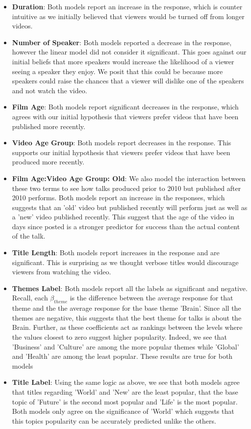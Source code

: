 \begin{itemize}
	\item \textbf{Duration}: Both models report an increase in the response, which is counter intuitive as we initially believed that viewers would be turned off from longer videos.
	\item \textbf{Number of Speaker}: Both models reported a decrease in the response, however the linear model did not consider it significant. This goes against our initial beliefs that more speakers would increase the likelihood of a viewer seeing a speaker they enjoy. We posit that this could be because more speakers could raise the chances that a viewer will dislike one of the speakers and not watch the video.
	\item \textbf{Film Age}: Both models report significant decreases in the response, which agrees with our initial hypothesis that viewers prefer videos that have been published more recently. 
	\item \textbf{Video Age Group}: Both models report decreases in the response. This supports our initial hypothesis that viewers prefer videos that have been produced more recently.
	\item \textbf{Film Age:Video Age Group: Old}: We also model the interaction between these two terms to see how talks produced prior to 2010 but published after 2010 performs. Both models report an increase in the responses, which suggests that an 'old' video but published recently will perform just as well as a 'new' video published recently. This suggest that the age of the video in days since posted is a stronger predictor for success than the actual content of the talk. 
	\item \textbf{Title Length}: Both models report increases in the response and are significant. This is surprising as we thought verbose titles would discourage viewers from watching the video. 
	\item \textbf{Themes Label}: Both models report all the labels as significant and negative. Recall, each $\beta_{theme}$ is the difference between the average response for that theme and the the average response for the base theme 'Brain'. Since all the themes are negative, this suggests that the best theme for talks is about the Brain. Further, as these coefficients act as rankings between the levels where the values closest to zero suggest higher popularity. Indeed, we see that 'Business' and 'Culture' are among the more popular themes while 'Global' and 'Health' are among the least popular. These results are true for both models
	\item \textbf{Title Label}: Using the same logic as above, we see that both models agree that titles regarding 'World' and 'New' are the least popular, that the base topic of 'Future' is the second most popular and 'Life' is the most popular. Both models only agree on the significance of 'World' which suggests that this topics popularity can be accurately predicted unlike the others.
\end{itemize}